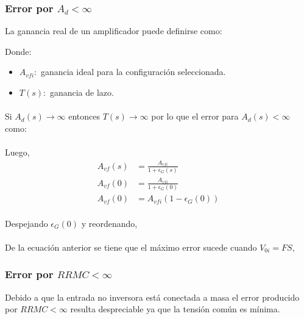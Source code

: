 \documentclass[11pt, a4paper]{article}
\begin{document}
\subsubsection{Error por $A_d<\infty$}
\onehalfspacing
La ganancia real de un amplificador puede definirse como:
\begin{center}
\end{center}
Donde:
\begin{itemize}
    \item $A_{vfi}:$ ganancia ideal para la configuración seleccionada.
    \item $T(s):$ ganancia de lazo.
\end{itemize}
\paragraph{}
Si $A_d(s)\rightarrow \infty$ entonces $T(s) \rightarrow \infty$ por lo que el error para $A_d(s)<\infty$ como:
\begin{center}
\end{center}
\paragraph{}
Luego,
\begin{align}
    \nonumber
    A_{vf}(s) &= \frac{A_{vfi}}{1 + \epsilon_G(s)} \\
    \nonumber
    A_{vf}(0) &= \frac{A_{vfi}}{1 + \epsilon_G(0)} \\
    \nonumber
    A_{vf}(0) &= A_{vfi}(1-\epsilon_G(0))
\end{align}
\paragraph{}
Despejando $\epsilon_G(0)$ y reordenando,
\begin{center}
\end{center}
\paragraph{}
De la ecuación anterior se tiene que el máximo error sucede cuando $V_{0i}=FS$,
\begin{center}
\end{center}

\subsubsection{Error por $RRMC<\infty$}
\onehalfspacing
Debido a que la entrada no inversora está conectada a masa el error producido por $RRMC<\infty$ resulta despreciable ya que la tensión común es mínima.
\end{document}
